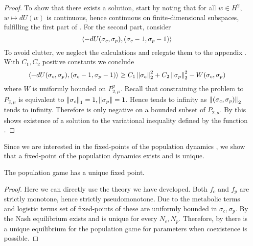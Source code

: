 \begin{proof}
  To show that there exists a solution, start by noting that for all $w\in H^2$, $w\mapsto dU(w)$ is continuous, hence continuous on finite-dimensional subspaces, fulfilling the first part of . For the second part,  consider
  \begin{equation}
    \label{eq:du}
    \left \langle -dU(\sigma_c,\sigma_p),(\sigma_c-1, \sigma_p-1) \right \rangle
  \end{equation}
  To avoid clutter, we neglect the calculations and relegate them to the appendix . With $C_1, C_2$ positive constants we conclude
  \begin{equation}
    \label{eq:fin_exist}
    \left \langle -dU(\sigma_c,\sigma_p),(\sigma_c-1, \sigma_p-1) \right \rangle \geq C_1\left \Vert \sigma_c \right \Vert_2^2 + C_2\left \Vert \sigma_p \right \Vert_2^2 - W(\sigma_c,\sigma_p)
  \end{equation}
  where $W$ is uniformly bounded on $P_{2,\mu}^2$. Recall that constraining the problem to $P_{2,\mu}$ is equivalent to $\left \Vert \sigma_c \right \Vert_1 = 1, \left \Vert \sigma_p \right \Vert = 1$. Hence  tends to infinity as $\left \Vert (\sigma_c,\sigma_p) \right \Vert_2$ tends to infinity. Therefore  is only negative on a bounded subset of $P_{2,\mu}$. By  this shows existence of a solution to the variational inequality defined by the function .

\end{proof}
Since we are interested in the fixed-points of the population dynamics , we show that a fixed-point of the population dynamics exists and is unique.
\begin{corollary}
  The population game  has a unique fixed point.
\end{corollary}
\begin{proof}
Here we can directly use the theory we have developed.  Both $f_c$ and $f_p$ are strictly monotone, hence strictly pseudomonotone. Due to the metabolic terms and logistic terms set of fixed-points of these are uniformly bounded in $\sigma_c, \sigma_p$. By  the Nash equilibrium exists and is unique for every $N_c, N_p$. Therefore, by  there is a unique equilibrium for the population game for parameters when coexistence is possible.
\end{proof}
